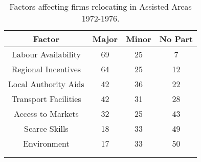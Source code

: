 \begin{longtable}{cccc}
\hline
\textbf{Factor} & \textbf{Major} & \textbf{Minor} & \textbf{No Part}\\ 
\hline
Labour Availability & 69 & 25 & 7 \\
Regional Incentives & 64 & 25 & 12\\
Local Authority Aids & 42 & 36 & 22 \\
Transport Facilities & 42 & 31 & 28 \\
Access to Markets & 32 & 25 & 43 \\
Scarce Skills & 18 & 33 & 49 \\
Environment & 17 & 33 & 50 \\
\hline \\

\caption{Factors affecting firms relocating in Assisted Areas 1972-1976.}  \label{tab:factors_relocation}\\
\end{longtable}


